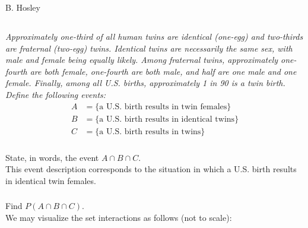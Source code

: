 \documentclass[12pt]{amsart}
\begin{document}
\raggedbottom

\hspace{\fill} {\large B. Hosley}
\bigskip


\setcounter{section}{1}
\setcounter{subsection}{4}
\subsection{} %
\textit{Approximately one-third of all human twins are identical (one-egg) and two-thirds are fraternal (two-egg) twins. 
	Identical twins are necessarily the same sex, with male and female being equally likely. 
	Among fraternal twins, approximately one-fourth are both female, one-fourth are both male, and half are one male and one female. 
	Finally, among all U.S. births, approximately 1 in 90 is a twin birth. Define the following events:}
	\begin{align*}
		A &= \{\text{a U.S. birth results in twin females}\} \\
		B &= \{\text{a U.S. birth results in identical twins}\} \\
		C &= \{\text{a U.S. birth results in twins}\}
	\end{align*}
	\subsubsection{} State, in words, the event \(A\cap B\cap C\). \\
	
	
	This event description corresponds to the situation in which a U.S. birth results in identical twin females.
	
	
	\subsubsection{} Find \(P(A\cap B\cap C)\). \\

	We may visualize the set interactions as follows (not to scale):
\end{document}
